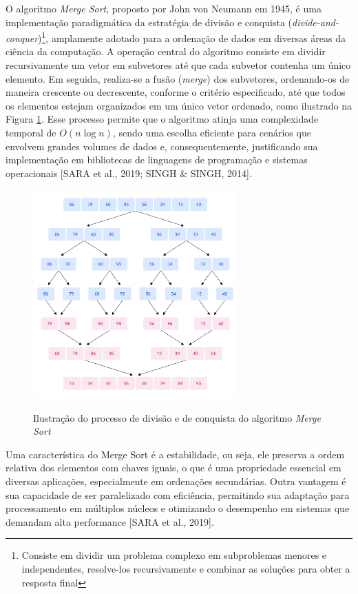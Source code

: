 \documentclass[12pt]{article}
\begin{document}
O algoritmo \textit{Merge Sort}, proposto por John von Neumann em 1945, é uma implementação paradigmática da estratégia de divisão e conquista (\textit{divide-and-conquer})\footnote{Consiste em dividir um problema complexo em subproblemas menores e independentes, resolve-los recursivamente e combinar as soluções para obter a resposta final}, amplamente adotado para a ordenação de dados em diversas áreas da ciência da computação. A operação central do algoritmo consiste em dividir recursivamente um vetor em subvetores até que cada subvetor contenha um único elemento. Em seguida, realiza-se a fusão (\textit{merge}) dos subvetores, ordenando-os de maneira crescente ou decrescente, conforme o critério especificado, até que todos os elementos estejam organizados em um único vetor ordenado, como ilustrado na Figura \ref{fig:arvore}. Esse processo permite que o algoritmo atinja uma complexidade temporal de $O(n\log{n})$, sendo uma escolha eficiente para cenários que envolvem grandes volumes de dados e, consequentemente, justificando sua implementação em bibliotecas de linguagens de programação e sistemas operacionais [SARA et al., 2019; SINGH \& SINGH, 2014].


\begin{figure}[H] \caption{Ilustração do processo de divisão e de conquista do algoritmo \textit{Merge Sort}} \centering \includegraphics[width=0.7\textwidth]{visualization.png}  \label{fig:arvore} \end{figure}

Uma característica do Merge Sort é a estabilidade, ou seja, ele preserva a ordem relativa dos elementos com chaves iguais, o que é uma propriedade essencial em diversas aplicações, especialmente em ordenações secundárias. Outra vantagem é sua capacidade de ser paralelizado com eficiência, permitindo sua adaptação para processamento em múltiplos núcleos e otimizando o desempenho em sistemas que demandam alta performance [SARA et al., 2019].
\end{document}
